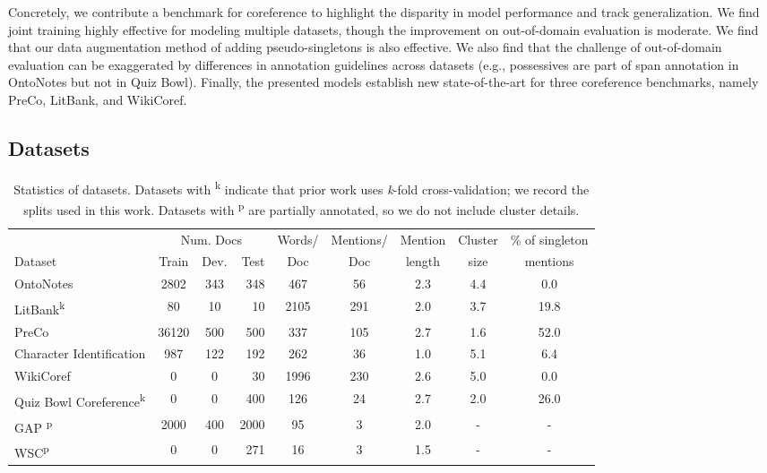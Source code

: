 \documentclass[12pt]{thesis-umich}[thesis]
\begin{document}
Concretely, we contribute a benchmark for coreference to highlight the disparity in model performance and track generalization. 
We find joint training highly effective for modeling multiple datasets, though the improvement on out-of-domain evaluation is moderate.  
We find that our data augmentation method of adding pseudo-singletons is also effective.
We also find that the challenge of out-of-domain evaluation can be exaggerated by differences in annotation guidelines across datasets (e.g., possessives are part of span annotation in OntoNotes but not in Quiz Bowl). 
Finally, the presented models establish new state-of-the-art for three coreference benchmarks, namely PreCo, LitBank, and WikiCoref.



\subsection{Datasets}
\label{sec:datasets}

         

\begin{table*}[t]
    \centering
    \small
    \setlength\tabcolsep{4pt} \begin{tabular}{lccrccccc}
    \toprule
         & \multicolumn{3}{c}{Num. Docs} & Words/ &  Mentions/ &Mention & Cluster & \% of singleton \\
         Dataset & Train & Dev. & Test  & Doc &Doc &  length &  size & mentions\\
    \midrule
         OntoNotes  & \phantom{1}2802 & 343 & 348 & \phantom{1}467 & \phantom{1}56 & 2.3 & 4.4 &  \phantom{1}0.0 \\
         LitBank\textsuperscript{k} & \phantom{11}80 & \phantom{1}10 & 10 & 2105 & 291 & 2.0 & 3.7 & 19.8 \\
         PreCo & 36120 & 500 & 500  & \phantom{1}337 & 105 & 2.7 & 1.6 & 52.0 \\
         Character Identification & \phantom{11}987 & 122 & 192  & \phantom{1}262 & \phantom{1}36 & 1.0 & 5.1 &  \phantom{1}6.4 \\
          WikiCoref & \phantom{1111}0 & \phantom{11}0 & 30 & 1996 & 230 & 2.6 & 5.0 & \phantom{1}0.0 \\
         Quiz Bowl Coreference\textsuperscript{k} & \phantom{1111}0 & \phantom{11}0 & 400 & \phantom{1}126 & \phantom{1}24 & 2.7 & 2.0 & 26.0 \\
         GAP \textsuperscript{p} & \phantom{1}2000 & 400 & 2000 &  \phantom{11}95 & \phantom{11}3 & 2.0 & - & - \\
         WSC\textsuperscript{p} & \phantom{1111}0 & \phantom{11}0 & 271 & \phantom{11}16 & \phantom{11}3 & 1.5 & - & -  \\
    \bottomrule
    \end{tabular}
    \caption{Statistics of datasets. Datasets with \textsuperscript{k} indicate that prior work uses \textit{k}-fold cross-validation; we record the splits used in this work. Datasets with \textsuperscript{p} are partially annotated, so we do not include cluster details.}
    
    \label{tab:data}
\end{table*} 
\end{document}
